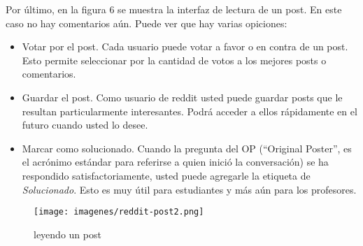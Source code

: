 \documentclass[]{article}
\makeatletter
\def\maxwidth{\ifdim\Gin@nat@width>\linewidth\linewidth
\else\Gin@nat@width\fi}
\let\Oldincludegraphics\includegraphics
\renewcommand{\includegraphics}[1]{\Oldincludegraphics[width=\maxwidth]{#1}}
\makeatother
\begin{document}
Por último, en la figura 6 se muestra la interfaz de lectura de un post.
En este caso no hay comentarios aún. Puede ver que hay varias opiciones:

\begin{itemize}
\item
  Votar por el post. Cada usuario puede votar a favor o en contra de un
  post. Esto permite seleccionar por la cantidad de votos a los mejores
  posts o comentarios.
\item
  Guardar el post. Como usuario de reddit usted puede guardar posts que
  le resultan particularmente interesantes. Podrá acceder a ellos
  rápidamente en el futuro cuando usted lo desee.
\item
  Marcar como solucionado. Cuando la pregunta del OP (``Original
  Poster'', es el acrónimo estándar para referirse a quien inició la
  conversación) se ha respondido satisfactoriamente, usted puede
  agregarle la etiqueta de \emph{Solucionado}. Esto es muy útil para
  estudiantes y más aún para los profesores.
\end{itemize}
\begin{figure}[htbp]
\centering
\texttt{[image: imagenes/reddit-post2.png]}
\caption{leyendo un post}
\end{figure}
\end{document}

